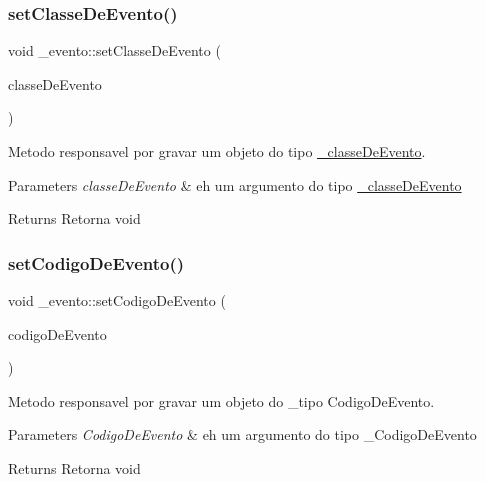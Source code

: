\subsubsection{\texorpdfstring{setClasseDeEvento()}{setClasseDeEvento()}}
{\footnotesize\ttfamily void \+\_\+evento\+::set\+Classe\+De\+Evento (\begin{DoxyParamCaption}\item[{const \mbox{\hyperlink{class__classe_de_evento}{\+\_\+classe\+De\+Evento}} \&}]{classe\+De\+Evento }\end{DoxyParamCaption})}



Metodo responsavel por gravar um objeto do tipo \mbox{\hyperlink{class__classe_de_evento}{\+\_\+classe\+De\+Evento}}. 


\begin{DoxyParams}{Parameters}
{\em classe\+De\+Evento} & eh um argumento do tipo \mbox{\hyperlink{class__classe_de_evento}{\+\_\+classe\+De\+Evento}} \\
\hline
\end{DoxyParams}
\begin{DoxyReturn}{Returns}
Retorna void 
\end{DoxyReturn}
\mbox{\label{class__evento_ad8f5f526282a8604ed5301ba40a766be}} 
\subsubsection{\texorpdfstring{setCodigoDeEvento()}{setCodigoDeEvento()}}
{\footnotesize\ttfamily void \+\_\+evento\+::set\+Codigo\+De\+Evento (\begin{DoxyParamCaption}\item[{const \mbox{\hyperlink{class__codigo_de_evento}{\+\_\+codigo\+De\+Evento}} \&}]{codigo\+De\+Evento }\end{DoxyParamCaption})}



Metodo responsavel por gravar um objeto do \+\_\+tipo Codigo\+De\+Evento. 


\begin{DoxyParams}{Parameters}
{\em Codigo\+De\+Evento} & eh um argumento do tipo \+\_\+\+Codigo\+De\+Evento \\
\hline
\end{DoxyParams}
\begin{DoxyReturn}{Returns}
Retorna void 
\end{DoxyReturn}
\mbox{\label{class__evento_a1dad563c93fdd542ba068a09b667ed4f}} 
